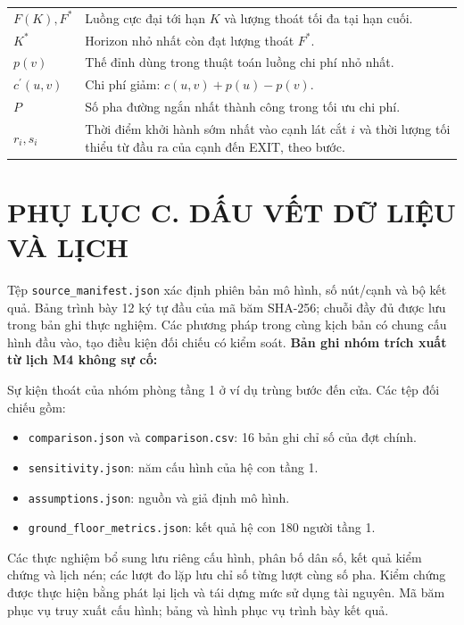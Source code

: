 \begin{longtable}{P{3.5cm}P{10.8cm}}
$F(K),F^*$ & Luồng cực đại tới hạn $K$ và lượng thoát tối đa tại hạn cuối.\\
$K^*$ & Horizon nhỏ nhất còn đạt lượng thoát $F^*$.\\
$p(v)$ & Thế đỉnh dùng trong thuật toán luồng chi phí nhỏ nhất.\\
$c^{\prime}(u,v)$ & Chi phí giảm: $c(u,v)+p(u)-p(v)$.\\
$P$ & Số pha đường ngắn nhất thành công trong tối ưu chi phí.\\
$r_i,s_i$ & Thời điểm khởi hành sớm nhất vào cạnh lát cắt $i$ và thời lượng tối thiểu từ đầu ra của cạnh đến EXIT, theo bước.\\
\end{longtable}\endgroup

\clearpage{}\section*{PHỤ LỤC C. DẤU VẾT DỮ LIỆU VÀ LỊCH}
Tệp \texttt{source\_manifest.json} xác định phiên bản mô hình, số nút/cạnh và bộ kết quả. Bảng trình bày 12 ký tự đầu của mã băm SHA-256; chuỗi đầy đủ được lưu trong bản ghi thực nghiệm. Các phương pháp trong cùng kịch bản có chung cấu hình đầu vào, tạo điều kiện đối chiếu có kiểm soát.
\noindent\textbf{Bản ghi nhóm trích xuất từ lịch M4 không sự cố:}

Sự kiện thoát của nhóm phòng tầng 1 ở ví dụ trùng bước đến cửa. Các tệp đối chiếu gồm:
\begin{itemize}
\item \texttt{comparison.json} và \texttt{comparison.csv}: 16 bản ghi chỉ số của đợt chính.
\item \texttt{sensitivity.json}: năm cấu hình của hệ con tầng 1.
\item \texttt{assumptions.json}: nguồn và giả định mô hình.
\item \texttt{ground\_floor\_metrics.json}: kết quả hệ con 180 người tầng 1.
\end{itemize}
Các thực nghiệm bổ sung lưu riêng cấu hình, phân bố dân số, kết quả kiểm chứng và lịch nén; các lượt đo lặp lưu chỉ số từng lượt cùng số pha. Kiểm chứng được thực hiện bằng phát lại lịch và tái dựng mức sử dụng tài nguyên. Mã băm phục vụ truy xuất cấu hình; bảng và hình phục vụ trình bày kết quả.
